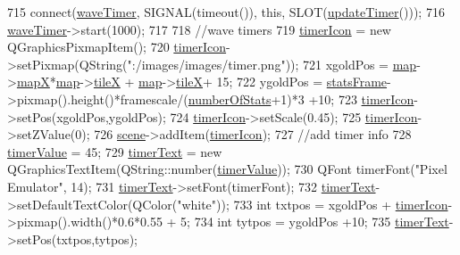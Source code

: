 \begin{DoxyCode}
715     connect(\hyperlink{class_game_a06a7795cf068aa5cc3b1debbea3f82ef}{waveTimer}, SIGNAL(timeout()), \textcolor{keyword}{this}, SLOT(\hyperlink{class_game_a89ee6bc4da77b30b9ab09d6148944cda}{updateTimer}()));
716     \hyperlink{class_game_a06a7795cf068aa5cc3b1debbea3f82ef}{waveTimer}->start(1000);
717 
718     \textcolor{comment}{//wave timers}
719     \hyperlink{class_game_a5853a185c9981da12d5a6330c5f121c7}{timerIcon} = \textcolor{keyword}{new} QGraphicsPixmapItem();
720     \hyperlink{class_game_a5853a185c9981da12d5a6330c5f121c7}{timerIcon}->setPixmap(QString(\textcolor{stringliteral}{":/images/images/timer.png"}));
721     xgoldPos = \hyperlink{class_game_acef3a39fdf14be2c980b0dc11e7be402}{map}->\hyperlink{class_map_acfd20721da29a2e353598555e23e12f0}{mapX}*\hyperlink{class_game_acef3a39fdf14be2c980b0dc11e7be402}{map}->\hyperlink{class_map_af2aa425dd22aba483ae973c4a15fe934}{tileX} + \hyperlink{class_game_acef3a39fdf14be2c980b0dc11e7be402}{map}->\hyperlink{class_map_af2aa425dd22aba483ae973c4a15fe934}{tileX}+ 15;
722     ygoldPos = \hyperlink{class_game_a3b40718d348c0f12af63a3f428924ab4}{statsFrame}->pixmap().height()*framescale/(\hyperlink{class_game_af041d097dc2350360c7951e5a41bc48a}{numberOfStats}+1)*3 +10;
723     \hyperlink{class_game_a5853a185c9981da12d5a6330c5f121c7}{timerIcon}->setPos(xgoldPos,ygoldPos);
724     \hyperlink{class_game_a5853a185c9981da12d5a6330c5f121c7}{timerIcon}->setScale(0.45);
725     \hyperlink{class_game_a5853a185c9981da12d5a6330c5f121c7}{timerIcon}->setZValue(0);
726     \hyperlink{class_game_a8119e3b9a632906c6808fa294b46a92a}{scene}->addItem(\hyperlink{class_game_a5853a185c9981da12d5a6330c5f121c7}{timerIcon});
727     \textcolor{comment}{//add timer info}
728     \hyperlink{class_game_aef6faf2c7e350578fea82f340353fa6b}{timerValue} = 45;
729     \hyperlink{class_game_a21d038c2747c61d3b5a2a3d8f1764086}{timerText} = \textcolor{keyword}{new} QGraphicsTextItem(QString::number(\hyperlink{class_game_aef6faf2c7e350578fea82f340353fa6b}{timerValue}));
730     QFont timerFont(\textcolor{stringliteral}{"Pixel Emulator"}, 14);
731     \hyperlink{class_game_a21d038c2747c61d3b5a2a3d8f1764086}{timerText}->setFont(timerFont);
732     \hyperlink{class_game_a21d038c2747c61d3b5a2a3d8f1764086}{timerText}->setDefaultTextColor(QColor(\textcolor{stringliteral}{"white"}));
733     \textcolor{keywordtype}{int} txtpos = xgoldPos + \hyperlink{class_game_a5853a185c9981da12d5a6330c5f121c7}{timerIcon}->pixmap().width()*0.6*0.55 + 5;
734     \textcolor{keywordtype}{int} tytpos = ygoldPos +10;
735     \hyperlink{class_game_a21d038c2747c61d3b5a2a3d8f1764086}{timerText}->setPos(txtpos,tytpos);

\end{DoxyCode}
